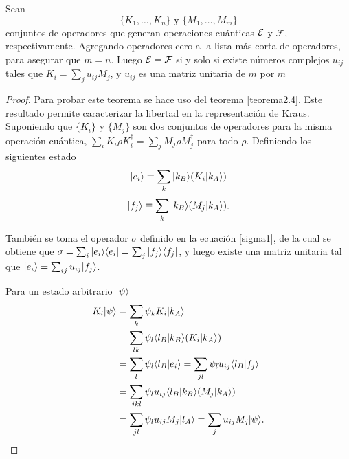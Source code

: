  \begin{theorem}\label{Libertad_unitaria}
    
    Sean \[\{K_1,\ldots,K_n\} \text{ y } \{M_1,\ldots , M_m\}\] conjuntos de operadores que generan operaciones cuánticas $\mathcal{E}$ y $\mathcal{F}$, respectivamente. Agregando operadores cero a la lista más corta de operadores, para asegurar que $m=n$. Luego $\mathcal{E}=\mathcal{F}$ si y solo si existe números complejos $u_{ij}$ tales que $K_i=\sum_j u_{ij}M_j$, y $u_{ij}$ es una matriz unitaria de $m$ por $m$
    
 \end{theorem}

\begin{proof}
Para probar este teorema se hace uso del teorema {\ref{teorema2.4}}. Este resultado permite caracterizar la libertad en la representación de Kraus. Suponiendo que $\{K_i\}$ y $\{M_j\}$ son dos conjuntos de operadores para la misma operación cuántica, $\sum_i K_i \rho K_i^\dagger= \sum_j M_j \rho M_j^\dagger$ para todo $\rho$. Definiendo los siguientes estado
\begin{equation}
    |e_i\rangle\equiv \sum_k |k_B\rangle(K_i|k_A\rangle)
\end{equation}
\begin{equation}
    |f_j\rangle\equiv \sum_k |k_B\rangle(M_j|k_A\rangle).
\end{equation}


También se toma el operador $\sigma$ definido en la ecuación {\ref{sigma1}}, de la cual se obtiene que $\sigma=\sum_i|e_i \rangle \langle e_i|=\sum_j |f_j\rangle \langle f_j|$, y luego existe una matriz unitaria tal que $  |e_i\rangle=\sum_{ij}u_{ij}|f_j\rangle$.

Para un estado arbitrario $|\psi\rangle$ 
\begin{equation}
    \begin{split}
        K_i|\psi\rangle&=\sum_k \psi_k K_i|k_A\rangle\\
                   &= \sum_{lk}\psi_l\langle l_B |k_B\rangle(K_i|k_A\rangle)\\
                   &=\sum_{l}\psi_l\langle l_B| e_i\rangle=\sum_{jl}\psi_l u_{ij}\langle l_B|f_j\rangle\\
                   &=\sum_{jkl}\psi_l u_{ij}\langle l_B|k_B\rangle(M_j|k_A\rangle)\\
                   &=\sum_{jl}\psi_l u_{ij}M_j|l_A\rangle=\sum_j u_{ij} M_j |\psi\rangle.\\
    \end{split}
\end{equation}



\end{proof}
